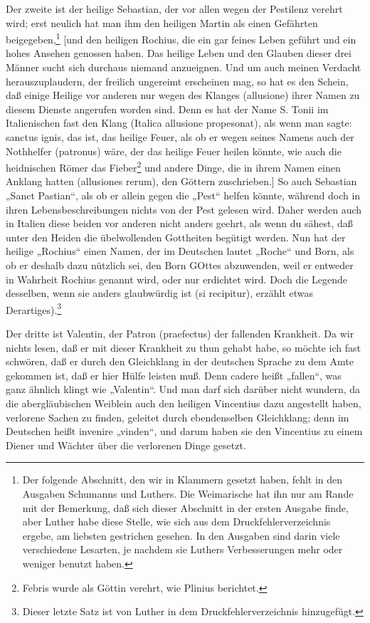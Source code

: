 Der zweite ist der heilige Sebastian, der vor allen wegen der Pestilenz verehrt wird; erst neulich hat man ihm den heiligen Martin als einen Gefährten beigegeben,\footnote{Der folgende Abschnitt, den wir in Klammern gesetzt haben, fehlt in den Ausgaben Schumanns und Luthers. Die Weimarische hat ihn nur am Rande mit der Bemerkung, daß sich dieser Abschnitt in der ersten Ausgabe finde, aber Luther habe diese Stelle, wie sich aus dem Druckfehlerverzeichnis ergebe, am liebsten gestrichen gesehen. In den Ausgaben sind darin viele verschiedene Lesarten, je nachdem sie Luthers Verbesserungen mehr oder weniger benutzt haben.} [und den heiligen Rochius, die ein gar feines Leben geführt und ein hohes Ansehen genossen haben. Das heilige Leben und den Glauben dieser drei Männer sucht sich durchaus niemand anzueignen. Und um auch meinen Verdacht herauszuplaudern, der freilich ungereimt erscheinen mag, so hat es den Schein, daß einige Heilige vor anderen nur wegen des Klanges (allusione) ihrer Namen zu diesem Dienste angerufen worden sind. Denn es hat der Name S. Tonii im Italienischen fast den Klang (Italica allusione propesonat), als wenn man sagte: sanctus ignis, das ist, das heilige Feuer, als ob er wegen seines Namens auch der Nothhelfer (patronus) wäre, der das heilige Feuer heilen könnte, wie auch die heidnischen Römer das Fieber\footnote{Febris wurde als Göttin verehrt, wie Plinius berichtet.} und andere Dinge, die in ihrem Namen einen Anklang hatten (allusiones rerum), den Göttern zuschrieben.] So auch Sebastian „Sanct Pastian“, als ob er allein gegen die „Pest“ helfen könnte, während doch in ihren Lebensbeschreibungen nichts von der Pest gelesen wird. Daher werden auch in Italien diese beiden vor anderen nicht anders geehrt, als wenn du sähest, daß unter den Heiden die übelwollenden Gottheiten begütigt werden. Nun hat der heilige „Rochius“ einen Namen, der im Deutschen lautet „Roche“ und Born, als ob er deshalb dazu nützlich sei, den Born GOttes abzuwenden, weil er entweder in Wahrheit Rochius genannt wird, oder nur erdichtet wird. Doch die Legende desselben, wenn sie anders glaubwürdig ist (si recipitur), erzählt etwas Derartiges).\footnote{Dieser letzte Satz ist von Luther in dem Druckfehlerverzeichnis hinzugefügt.}

Der dritte ist Valentin, der Patron (praefectus) der fallenden Krankheit. Da wir nichts lesen, daß er mit dieser Krankheit zu thun gehabt habe, so möchte ich fast schwören, daß er durch den Gleichklang in der deutschen Sprache zu dem Amte gekommen ist, daß er hier Hülfe leisten muß. Denn cadere heißt „fallen“, was ganz ähnlich klingt wie „Valentin“. Und man darf sich darüber nicht wundern, da die abergläubischen Weiblein auch den heiligen Vincentius dazu angestellt haben, verlorene Sachen zu finden, geleitet durch ebendenselben Gleichklang; denn im Deutschen heißt invenire „vinden“, und darum haben sie den Vincentius zu einem Diener und Wächter über die verlorenen Dinge gesetzt.


